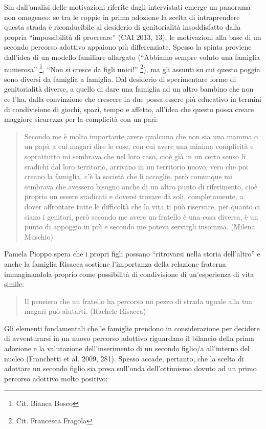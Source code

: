 \documentclass[12pt,oneside,svgnames]{memoir}
\newenvironment{quotationb}%
{\color{maincolor}\begin{leftbar}\begin{quotation}}%
{\end{quotation}\end{leftbar}\ignorespacesafterend}
\begin{document}
Sin dall'analisi delle motivazioni riferite dagli intervistati emerge un
panorama non omogeneo: se tra le coppie in prima adozione la scelta di
intraprendere questa strada è riconducibile al desiderio di
genitorialità insoddisfatto dalla propria ``impossibilità di procreare''
(CAI 2013, 13), le motivazioni alla base di un secondo percorso adottivo
appaiono più differenziate. Spesso la spinta proviene dall'idea di un
modello familiare allargato (``Abbiamo sempre voluto una famiglia
numerosa'' \footnote{Cit. Bianca Bosco}, ``Non si cresce da figli
unici!'' \footnote{Cit. Francesca Fragola}), ma gli assunti su cui
questo poggia sono diversi da famiglia a famiglia. Dal desiderio di
sperimentare forme di genitorialità diverse, a quello di dare una
famiglia ad un altro bambino che non ce l'ha, dalla convinzione che
crescere in due possa essere più educativo in termini di condivisione di
giochi, spazi, tempo e affetto, all'idea che questo possa creare
maggiore sicurezza per la complicità con un pari:

\begin{quotationb}
Secondo me è molto importante avere qualcuno che non sia una mamma o un
papà a cui magari dire le cose, con cui avere una minima complicità e
soprattutto mi sembrava che nel loro caso, cioè già in un certo senso li
sradichi dal loro territorio, arrivano in un territorio nuovo, vero che
poi creano la famiglia, c'è la società che li accoglie, però comunque mi
sembrava che avessero bisogno anche di un altro punto di riferimento,
cioè proprio un essere sradicati e doversi trovare da soli,
completamente, a dover affrontare tutte le difficoltà che la vita ti può
riservare, per quanto ci siano i genitori, però secondo me avere un
fratello è una cosa diversa, è un punto di appoggio in più e secondo me
poteva servirgli insomma. (Milena Muschio)
\end{quotationb}

Pamela Pioppo spera che i propri figli possano ``ritrovarsi nella storia
dell'altro'' e anche la famiglia Risacca sostiene l'importanza della
relazione fraterna immaginandola proprio come possibilità di
condivisione di un'esperienza di vita simile:

\begin{quotationb}
Il pensiero che un fratello ha percorso un pezzo di strada uguale alla
tua magari può aiutarti. (Rachele Risacca)
\end{quotationb}

Gli elementi fondamentali che le famiglie prendono in considerazione per
decidere di avventurarsi in un nuovo percorso adottivo riguardano il
bilancio della prima adozione e la valutazione dell'inserimento di un
secondo figlio/a all'interno del nucleo (Franchetti et al. 2009, 281).
Spesso accade, pertanto, che la scelta di adottare un secondo figlio sia
presa sull'onda dell'ottimismo dovuto ad un primo percorso adottivo
molto positivo:
\end{document}
